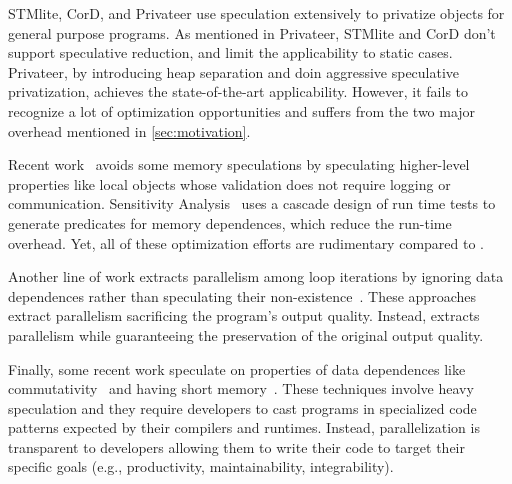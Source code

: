 STMlite, CorD, and Privateer use speculation extensively to privatize
objects for general purpose programs. As mentioned in Privateer, STMlite
and CorD don't support speculative reduction, and limit the applicability
to static cases. Privateer, by introducing heap separation and doin
aggressive speculative privatization, achieves the state-of-the-art
applicability. However, it fails to recognize a lot of optimization
opportunities and suffers from the two major overhead mentioned in
\ref{sec:motivation}.

Recent work~\cite{ctian:2008:micro,johnson:12:pldi,kim:12:cgo} avoids some
memory speculations by speculating higher-level properties like local
objects whose validation does not require logging or communication.
Sensitivity Analysis~\cite{Rus:07:ics} uses a cascade design of run time
tests to generate predicates for memory dependences, which reduce the
run-time overhead. Yet, all of these optimization efforts are rudimentary
compared to \namensp.

Another line of work extracts parallelism among loop iterations by ignoring data dependences rather than speculating their non-existence~\cite{campanoni:2015:cgo,Udupa:2011:AEB:1993498.1993555,misailovic2013parallelizing}.
These approaches extract parallelism sacrificing the program's output quality.
Instead, \name extracts parallelism while guaranteeing the preservation of the original output quality.

Finally, some recent work speculate on properties of data dependences like commutativity~\cite{kulkarni:07:pldi,Nguyen:2014:DGO:2541940.2541964} and having short memory~\cite{Deiana:2018:UPN:3173162.3173181}.
These techniques involve heavy speculation and they require developers to cast programs in specialized code patterns expected by their compilers and runtimes.
Instead, \name parallelization is transparent to developers allowing them to write their code to target their specific goals (e.g., productivity, maintainability, integrability).


